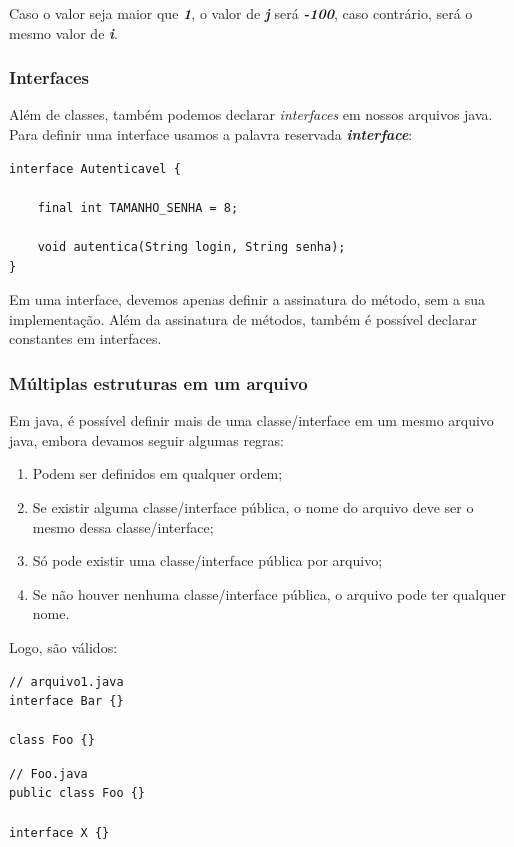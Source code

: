 \documentclass[12pt]{article}
\begin{document}
Caso o valor seja maior que \textbf{\textit{1}}, o valor de \textbf{\textit{j}} será \textbf{\textit{-100}}, caso contrário, será o mesmo valor de \textbf{\textit{i}}.

\subsubsection{Interfaces}

Além de classes, também podemos declarar \textit{interfaces} em nossos arquivos java. Para definir uma interface usamos a palavra reservada \textbf{\textit{interface}}:

\begin{lstlisting}
interface Autenticavel {
	
	final int TAMANHO_SENHA = 8;
	
	void autentica(String login, String senha);
}
\end{lstlisting}

Em uma interface, devemos apenas definir a assinatura do método, sem a sua implementação. Além da assinatura de métodos, também é possível declarar constantes em interfaces.

\subsubsection{Múltiplas estruturas em um arquivo}

Em java, é possível definir mais de uma classe/interface em um mesmo arquivo java, embora devamos seguir algumas regras:

\begin{enumerate}
	\item Podem ser definidos em qualquer ordem;
	\item Se existir alguma classe/interface pública, o nome do arquivo deve ser o mesmo dessa classe/interface;
	\item Só pode existir uma classe/interface pública por arquivo;
	\item Se não houver nenhuma classe/interface pública, o arquivo pode ter qualquer nome.
\end{enumerate}

Logo, são válidos:

\begin{lstlisting}
// arquivo1.java
interface Bar {}

class Foo {}
\end{lstlisting}


\begin{lstlisting}
// Foo.java
public class Foo {}

interface X {}
\end{lstlisting}
\end{document}
